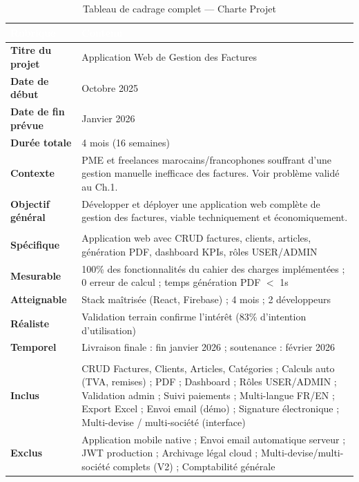 \documentclass[12pt,a4paper]{report}
\begin{document}
\begin{table}[H]
\centering
\caption{Tableau de cadrage complet — Charte Projet}
\label{tab:cadrage}
\begin{tabularx}{\textwidth}{|l|X|}
\hline
\rowcolor{emsiblue}\textcolor{white}{\textbf{Rubrique}} & \textcolor{white}{\textbf{Contenu}} \\
\hline
\textbf{Titre du projet} & Application Web de Gestion des Factures \\
\textbf{Date de début} & Octobre 2025 \\
\textbf{Date de fin prévue} & Janvier 2026 \\
\textbf{Durée totale} & 4 mois (16 semaines) \\
\textbf{Contexte} & PME et freelances marocains/francophones souffrant d'une gestion manuelle inefficace des factures. Voir problème validé au Ch.1. \\
\textbf{Objectif général} & Développer et déployer une application web complète de gestion des factures, viable techniquement et économiquement. \\
\hline
\rowcolor{lightblue}\multicolumn{2}{|l|}{\textbf{Objectifs SMART}} \\
\hline
\textbf{Spécifique} & Application web avec CRUD factures, clients, articles, génération PDF, dashboard KPIs, rôles USER/ADMIN \\
\textbf{Mesurable} & 100\% des fonctionnalités du cahier des charges implémentées ; 0 erreur de calcul ; temps génération PDF $<$ 1s \\
\textbf{Atteignable} & Stack maîtrisée (React, Firebase) ; 4 mois ; 2 développeurs \\
\textbf{Réaliste} & Validation terrain confirme l'intérêt (83\% d'intention d'utilisation) \\
\textbf{Temporel} & Livraison finale : fin janvier 2026 ; soutenance : février 2026 \\
\hline
\rowcolor{lightblue}\multicolumn{2}{|l|}{\textbf{Périmètre}} \\
\hline
\textbf{Inclus} & CRUD Factures, Clients, Articles, Catégories ; Calculs auto (TVA, remises) ; PDF ; Dashboard ; Rôles USER/ADMIN ; Validation admin ; Suivi paiements ; Multi-langue FR/EN ; Export Excel ; Envoi email (démo) ; Signature électronique ; Multi-devise / multi-société (interface) \\
\textbf{Exclus} & Application mobile native ; Envoi email automatique serveur ; JWT production ; Archivage légal cloud ; Multi-devise/multi-société complets (V2) ; Comptabilité générale \\

\end{tabularx}
\end{table}
\end{document}
